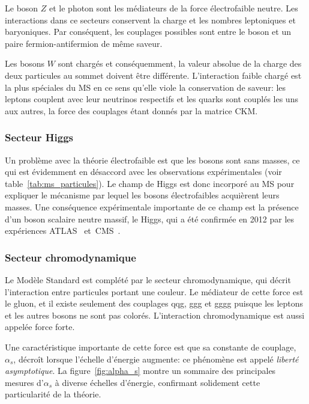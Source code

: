 Le boson $Z$ et le photon sont les médiateurs de la force
électrofaible neutre. Les interactions dans ce secteurs conservent la
charge et les nombres leptoniques et baryoniques. Par conséquent, les
couplages possibles sont entre le boson et un paire
fermion-antifermion de même saveur.

Les bosons $W$ sont chargés et conséquemment, la valeur absolue de la
charge des deux particules au sommet doivent être
différente. L'interaction faible chargé est la plus spéciales du MS en
ce sens qu'elle viole la conservation de saveur: les leptons couplent
avec leur neutrinos respectifs et les quarks sont couplés les uns aux
autres, la force des couplages étant donnés par la matrice CKM.

\subsubsection{Secteur Higgs}
Un problème avec la théorie électrofaible est que les bosons sont sans
masses, ce qui est évidemment en désaccord avec les observations
expérimentales (voir table~\ref{tab:ms_particules}). Le champ de Higgs
est donc incorporé au MS pour expliquer le mécanisme par lequel les
bosons électrofaibles acquièrent leurs masses. Une conséquence
expérimentale importante de ce champ est la présence d'un boson
scalaire neutre massif, le Higgs, qui a été confirmée en 2012 par les
expériences ATLAS~\cite{aad_observation_2012} et~CMS~\cite{chatrchyan_observation_2012}.

\subsubsection{Secteur chromodynamique}
Le Modèle Standard est complété par le secteur chromodynamique, qui
décrit l'interaction entre particules portant une couleur. Le
médiateur de cette force est le gluon, et il existe seulement des
couplages qqg, ggg et gggg puisque les leptons et les autres bosons ne
sont pas colorés. L'interaction chromodynamique est aussi appelée
force forte.

Une caractéristique importante de cette force est que sa
constante de couplage, $\alpha_s$, décroît lorsque l'échelle d'énergie
augmente: ce phénomène est appelé \emph{liberté asymptotique}. La
figure~\ref{fig:alpha_s} montre un sommaire des principales mesures
d'$\alpha_s$ à diverse échelles d'énergie, confirmant solidement cette
particularité de la théorie.

